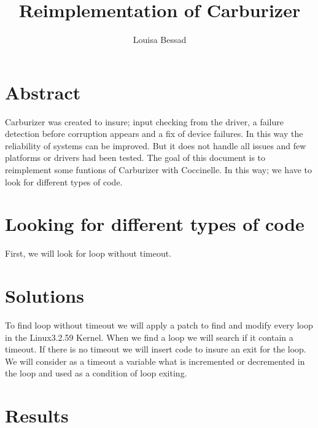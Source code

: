 \documentclass[11pt]{article}
\title{\fontsize{15pt}{10pt}\selectfont\textbf{Reimplementation of Carburizer}}
\author{Louisa Bessad}
\begin{document}
\maketitle

\section{Abstract}
Carburizer was created to insure; input checking from the driver, a failure detection before corruption appears and a fix of device failures. In this way the reliability of systems can be improved. But it does not handle all issues and few platforms or drivers had been tested. The goal of this document is to reimplement some funtions of Carburizer with Coccinelle. In this way; we have to look for different types of code.

\section{Looking for different types of code}
First, we will look for loop without timeout. 

\section{Solutions}
To find loop without timeout we will apply a patch to find and modify every loop in the Linux3.2.59 Kernel. When we find a loop we will search if it contain a timeout. If there is no timeout we will insert code to insure an exit for the loop. We will consider as a timeout a variable what is incremented or decremented in the loop and used as a condition of loop exiting.

\section{Results}
\end{document}

